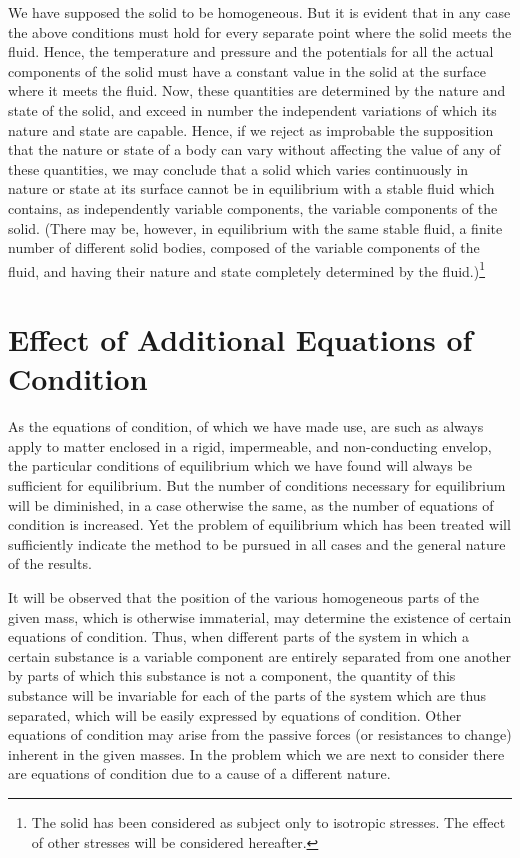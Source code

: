 \documentclass[11pt]{article}
\begin{document}
We have supposed the solid to be homogeneous. But it is evident that in any case the above conditions must hold for every separate point where the solid meets the fluid. Hence, the temperature and pressure and the potentials for all the actual components of the solid must have a constant value in the solid at the surface where it meets the fluid. Now, these quantities are determined by the nature and state of the solid, and exceed in number the independent variations of which its nature and state are capable. Hence, if we reject as improbable the supposition that the nature or state of a body can vary without affecting the value of any of these quantities, we may conclude that a solid which varies continuously in nature or state at its surface cannot be in equilibrium with a stable fluid which contains, as independently variable components, the variable components of the solid. (There may be, however, in equilibrium with the same stable fluid, a finite number of different solid bodies, composed of the variable components of the fluid, and having their nature and state completely determined by the fluid.)\footnote{The solid has been considered as subject only to isotropic stresses. The effect of other stresses will be considered hereafter.}

\section*{Effect of Additional Equations of Condition}

As the equations of condition, of which we have made use, are such as always apply to matter enclosed in a rigid, impermeable, and non-conducting envelop, the particular conditions of equilibrium which we have found will always be sufficient for equilibrium. But the number of conditions necessary for equilibrium will be diminished, in a case otherwise the same, as the number of equations of condition is increased. Yet the problem of equilibrium which has been treated will sufficiently indicate the method to be pursued in all cases and the general nature of the results.

It will be observed that the position of the various homogeneous parts of the given mass, which is otherwise immaterial, may determine the existence of certain equations of condition. Thus, when different parts of the system in which a certain substance is a variable component are entirely separated from one another by parts of which this substance is not a component, the quantity of this substance will be invariable for each of the parts of the system which are thus separated, which will be easily expressed by equations of condition. Other equations of condition may arise from the passive forces (or resistances to change) inherent in the given masses. In the problem which we are next to consider there are equations of condition due to a cause of a different nature.
\end{document}
